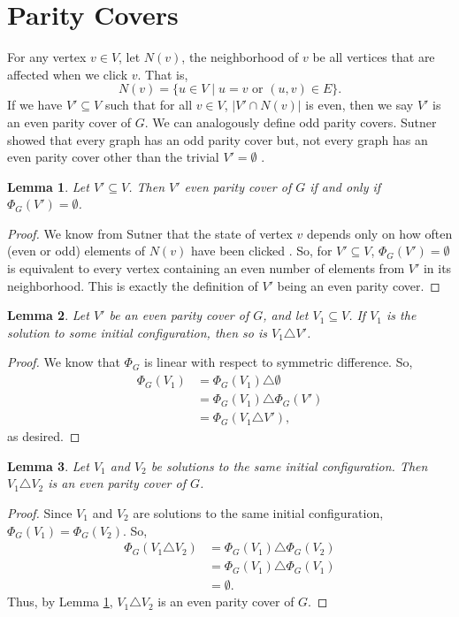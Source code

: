 \documentclass[a4paper]{article}
\newtheorem{lemma}{Lemma}
\newcommand{\abs}[1]{\left| #1 \right|}
\begin{document}
	\section{Parity Covers}
	For any vertex $v \in V$, let $N(v)$, the neighborhood of $v$ be all vertices that are affected when we click $v$.
	That is,
	\begin{equation*}
		N(v) = \{u \in V \mid u=v \text{ or } (u,v) \in E\}.
	\end{equation*}
	If we have $V' \subseteq V$ such that for all $v \in V$, $\abs{V' \cap N(v)}$ is even, then we say $V'$ is an even parity cover of $G$.
	We can analogously define odd parity covers.
	Sutner showed that every graph has an odd parity cover but, not every graph has an even parity cover other than the trivial $V' = \emptyset$ \cite{Sutner1989}.
	
	\begin{lemma}\label{empty-is-even}
		Let $V' \subseteq V$.
		Then $V'$ even parity cover of $G$ if and only if $\Phi_G(V') = \emptyset$.
	\end{lemma}
	\begin{proof}
		We know from Sutner that the state of vertex $v$ depends only on how often (even or odd) elements of $N(v)$ have been clicked \cite{Sutner1989}.
		So, for $V' \subseteq V$, $\Phi_G(V') = \emptyset$ is equivalent to every vertex containing an even number of elements from $V'$ in its neighborhood.
		This is exactly the definition of $V'$ being an even parity cover.
	\end{proof}
	
	\begin{lemma}
		Let $V'$ be an even parity cover of $G$, and let $V_1 \subseteq V$.
		If $V_1$ is the solution to some initial configuration, then so is $V_1 \triangle V'$.
	\end{lemma}
	\begin{proof}
		We know that $\Phi_G$ is linear with respect to symmetric difference.
		So,
		\begin{align*}
			\Phi_G(V_1) &= \Phi_G(V_1) \triangle \emptyset \\
			&= \Phi_G(V_1) \triangle \Phi_G(V') \\
			&= \Phi_G(V_1 \triangle V'),
		\end{align*}
		as desired.
	\end{proof}

	\begin{lemma}
		Let $V_1$ and $V_2$ be solutions to the same initial configuration.
		Then $V_1 \triangle V_2$ is an even parity cover of $G$.
	\end{lemma}
	\begin{proof}
		Since $V_1$ and $V_2$ are solutions to the same initial configuration, $\Phi_G(V_1) = \Phi_G(V_2)$.
		So,
		\begin{align*}
			\Phi_G(V_1 \triangle V_2) &= \Phi_G(V_1) \triangle \Phi_G(V_2) \\
			&= \Phi_G(V_1) \triangle \Phi_G(V_1) \\
			&= \emptyset.
		\end{align*}
		Thus, by Lemma \ref{empty-is-even}, $V_1 \triangle V_2$ is an even parity cover of $G$.
	\end{proof}
\end{document}

